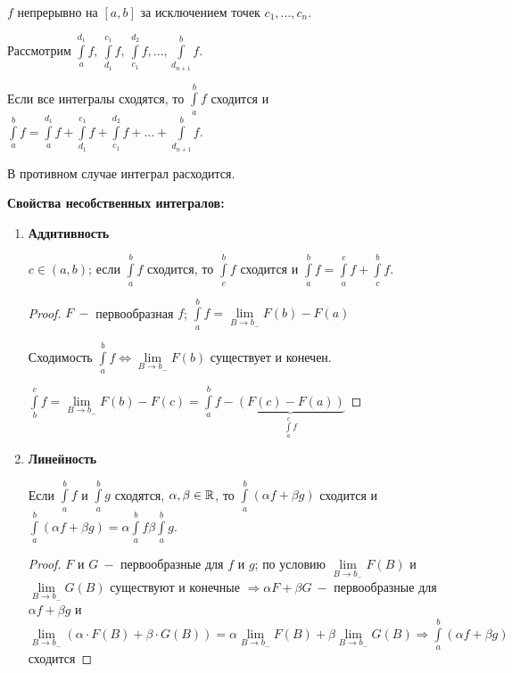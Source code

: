 \begin{definition}
    $f$ непрерывно на $[a,b]$ за исключением точек $c_1,...,c_n$.

    Рассмотрим $\int\limits_a^{d_1} f,\ \int\limits_{d_1}^{c_1} f,\ \int\limits_{c_1}^{d_2} f,..., \int\limits_{d_{n+1}}^{b} f$.

    Если все интегралы сходятся, то $\int\limits_a^b f$ сходится и $\int\limits_a^b f=\int\limits_a^{d_1} f+\int\limits_{d_1}^{c_1} f+ \int\limits_{c_1}^{d_2} f+...+ \int\limits_{d_{n+1}}^{b} f$.

    В противном случае интеграл расходится.
\end{definition}

\begin{statement}
    \textbf{Свойства несобственных интегралов:}
    \begin{enumerate}
        \item \textbf{Аддитивность}

        $c\in (a,b)$; если $\int\limits_a^b f$ сходится, то $\int\limits_c^b f$ сходится и $\int\limits_a^b f=\int\limits_a^c f+\int\limits_c^b f$.

        \begin{proof}
            $F\ -$ первообразная $f$; $\int\limits_a^b f = \lim\limits_{B\rightarrow b_-}F(b)-F(a)$

            Сходимость $\int\limits_a^b f\Leftrightarrow \lim\limits_{B\rightarrow b_-}F(b)$ существует и конечен.

            $\int\limits_b^c f=\lim\limits_{B\rightarrow b_-}F(b)-F(c)=\int\limits_a^b f - \underbrace{(F(c)-F(a))}_{\int\limits_a^c f}$
        \end{proof}
        \item \textbf{Линейность}

        Если $\int\limits_a^b f$ и $\int\limits_a^b g$ сходятся, $\alpha, \beta\in \mathbb{R}$, то $\int\limits_a^b(\alpha f+\beta g)$ сходится и $\int\limits_a^b(\alpha f+\beta g)=\alpha\int\limits_a^b f\beta \int\limits_a^b g$.
        \begin{proof}
            $F$ и $G\ -$ первообразные для $f$ и $g$; по условию $\lim\limits_{B\rightarrow b_-} F(B)$ и $\lim\limits_{B\rightarrow b_-} G(B)$ существуют и конечные $\Rightarrow\alpha F + \beta G\ -$ первообразные для $\alpha f + \beta g$ и $\lim\limits_{B\rightarrow b_-}(\alpha\cdot F(B) + \beta\cdot G(B))=\alpha\lim\limits_{B\rightarrow b_-}F(B) + \beta\lim\limits_{B\rightarrow b_-} G(B)\Rightarrow \int\limits_a^b (\alpha f + \beta g)$ сходится


\end{proof}
\end{enumerate}
\end{statement}
